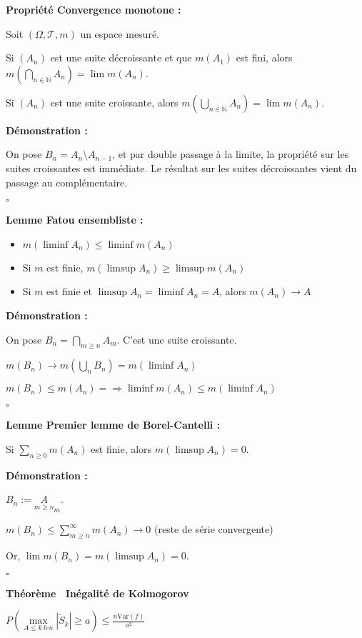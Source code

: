 \documentclass[10pt,a4paper,notitlepage ]{report}
\newcommand{\N}{\mathbb N}
\newcommand{\T}{\mathcal T}
\newcommand{\var}{\mathrm{Var}}
\newcounter{th}
\newenvironment{theorem}[1][]{
\refstepcounter{th}
\begin{tcolorbox}
	\textbf{Théorème \theth \ #1}
	
	
}{\end{tcolorbox}}
\newenvironment{propriete}[1][]{
	\begin{tcolorbox}
		\textbf{Propriété #1 : }
}
{\end{tcolorbox}}
\newenvironment{demo}[1][]{

	\textbf{Démonstration #1 :}
}{\begin{flushright}
	$\square$
\end{flushright}
}
\newenvironment{lemme}[1][]{
	\begin{tcolorbox}
		\textbf{Lemme #1 : }
	}
	{\end{tcolorbox}}
\begin{document}
\begin{propriete}[Convergence monotone]
	Soit $(\Omega, \T, m)$ un espace mesuré.
	
	Si $(A_n)$ est une suite décroissante et que $m(A_1)$ est fini, alors $m(\underset {n\in\N} \bigcap A_n) = \lim m(A_n)$.
	
	Si $(A_n)$ est une suite croissante, alors $m(\underset {n\in\N} \bigcup A_n) = \lim m(A_n)$.
\end{propriete}

\begin{demo}
	On pose $B_n = A_n \setminus A_{n-1}$, et par double passage à la limite, la propriété sur les suites croissantes est immédiate. Le résultat sur les suites décroissantes vient du passage au complémentaire.
\end{demo}

\begin{lemme}[Fatou ensembliste]
	\begin{itemize}
		\item $m(\liminf A_n) \le \liminf m(A_n)$
		\item Si $m$ est finie, $m(\limsup A_n) \ge \limsup m(A_n)$
		\item Si $m$ est finie et $\limsup A_n = \liminf A_n = A$, alors $m(A_n) \rightarrow A$
	\end{itemize}
\end{lemme}

\begin{demo}
	On pose $B_n = \underset {m \ge n} \bigcap A_m$. C'est une suite croissante.
	
	$m(B_n) \rightarrow m(\underset n \bigcup B_n) = m(\liminf A_n)$
	
	$m(B_n) \le m(A_n)= \Rightarrow \liminf m(A_n) \le m(\liminf A_n)$
\end{demo}

\begin{lemme}[Premier lemme de Borel-Cantelli]
	Si $\underset {n\ge 0} \sum m(A_n)$ est finie, alors $m(\limsup A_n) = 0$.
\end{lemme}

\begin{demo}
	$B_n := \underset {m\ge n} A_m$.
	
	$m(B_n) \le \sum_{m \ge n}^\infty m(A_n) \rightarrow 0$ (reste de série convergente)
	
	Or, $\lim m(B_n) = m(\limsup A_n) = 0$.
\end{demo}

\begin{theorem}[Inégalité de Kolmogorov]
	$P( \underset {A \le k \ le n} \max |\tilde S_k| \ge a) \le \frac {n \var(f)} {a^2}$
\end{theorem}
\end{document}
